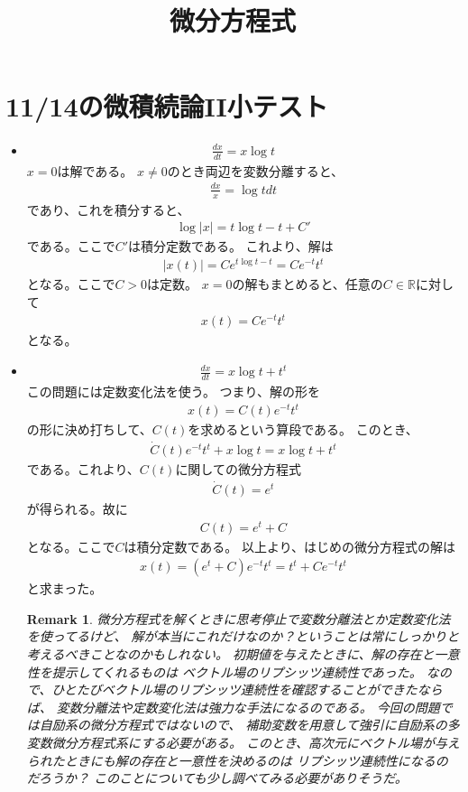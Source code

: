 \documentclass{jsarticle}
\newtheorem{remark}{Remark}
\begin{document}
\title{微分方程式}
\maketitle
\section{11/14の微積続論II小テスト}
\begin{itemize}
\item 
\begin{align}
\frac{dx}{dt}=x\log t
\end{align}
$x=0$は解である。
$x\ne 0$のとき両辺を変数分離すると、
\begin{align}
\frac{dx}{x}=\log tdt
\end{align}
であり、これを積分すると、
\begin{align}
\log |x|=t\log t-t+C'
\end{align}
である。ここで$C'$は積分定数である。
これより、解は
\begin{align}
|x(t)|=Ce^{t\log t-t}=Ce^{-t}t^{t}
\end{align}
となる。ここで$C>0$は定数。
$x=0$の解もまとめると、任意の$C\in\mathbb{R}$に対して
\begin{align}
x(t)=Ce^{-t}t^{t}
\end{align}
となる。
\item
\begin{align}
\frac{dx}{dt}=x\log t+t^{t}
\end{align}
この問題には定数変化法を使う。
つまり、解の形を
\begin{align}
x(t)=C(t)e^{-t}t^{t}
\end{align}
の形に決め打ちして、$C(t)$を求めるという算段である。
このとき、
\begin{align}
\dot{C}(t)e^{-t}t^{t}+x\log t=x\log t+t^{t}
\end{align}
である。これより、$C(t)$に関しての微分方程式
\begin{align}
\dot{C}(t)=e^{t}
\end{align}
が得られる。故に
\begin{align}
C(t)=e^{t}+C
\end{align}
となる。ここで$C$は積分定数である。
以上より、はじめの微分方程式の解は
\begin{align}
x(t)=(e^{t}+C)e^{-t}t^{t}=t^{t}+Ce^{-t}t^{t}
\end{align}
と求まった。

\begin{remark}
微分方程式を解くときに思考停止で変数分離法とか定数変化法を使ってるけど、
解が本当にこれだけなのか？ということは常にしっかりと考えるべきことなのかもしれない。
初期値を与えたときに、解の存在と一意性を提示してくれるものは
ベクトル場のリプシッツ連続性であった。
なので、ひとたびベクトル場のリプシッツ連続性を確認することができたならば、
変数分離法や定数変化法は強力な手法になるのである。
今回の問題では自励系の微分方程式ではないので、
補助変数を用意して強引に自励系の多変数微分方程式系にする必要がある。
このとき、高次元にベクトル場が与えられたときにも解の存在と一意性を決めるのは
リプシッツ連続性になるのだろうか？
このことについても少し調べてみる必要がありそうだ。
\end{remark}

\end{itemize}
\end{document}
